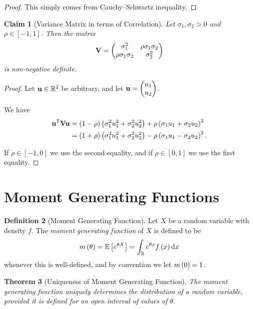 \documentclass{article}
\newtheorem{theorem}{Theorem}[section]
\newtheorem{claim}[theorem]{Claim}
\theoremstyle{definition}
\newtheorem{definition}[theorem]{Definition}
\theoremstyle{remark}
\newcommand{\RR}{\mathbb{R}}
\newcommand{\Expt}{\mathbb{E}}
\newcommand{\transpose}{^{\mathsf{T}}}
\newcommand{\ccintv}[2]{[#1,#2]}
\newcommand{\pmqty}[1]{\begin{pmatrix}#1\end{pmatrix}}
\begin{document}
\begin{proof}
    This simply comes from Cauchy--Schwartz inequality.
\end{proof}

\begin{claim}[Variance Matrix in terms of Correlation]
    \label{claim:var-mat-corr}%
    Let \(\sigma_1, \sigma_2 > 0\) and \(\rho \in \ccintv{-1}{1}\). Then the matrix
    \[
        \vb{V} = \pmqty{
            \sigma_1^2 & \rho \sigma_1 \sigma_2 \\
            \rho \sigma_1 \sigma_2 & \sigma_2^2
        }
    \]
    is non-negative definite.
\end{claim}

\begin{proof}
    Let \(\vb{u} \in \RR^2\) be arbitrary, and let \(\vb{u} = \pmqty{u_1 \\ u_2}\).

    We have
    \begin{align*}
        \vb{u}\transpose \vb{V} \vb{u} &= \pqty{1 - \rho} \pqty{\sigma_1^2 u_1^2 + \sigma_2^2 u_2^2} + \rho \pqty{\sigma_1 u_1 + \sigma_2 u_2}^2 \\
        &= \pqty{1 + \rho} \pqty{\sigma_1^2 u_1^2 + \sigma_2^2 u_2^2} - \rho \pqty{\sigma_1 u_1 - \sigma_2 u_2}^2.
    \end{align*}

    If \(\rho \in \ccintv{-1}{0}\) we use the second equality, and if \(\rho \in \ccintv{0}{1}\) we use the first equality.
\end{proof}

\section{Moment Generating Functions}

\begin{definition}[Moment Generating Function]
    \label{def:moment-generating-fn}%
    Let \(X\) be a random variable with density \(f\). The \emph{moment generating function} of \(X\) is defined to be
    \[
        m\pqty{\theta} = \Expt\bqty{e^{\theta X}} = \int_{\RR} e^{\theta x} f\pqty{x} \dd{x}
    \]
    whenever this is well-defined, and by convention we let \(m\left(0\right) = 1\).
\end{definition}

\begin{theorem}[Uniqueness of Moment Generating Function]
    \label{thm:uniqueness-mgf}%
    The moment generating function uniquely determines the distribution of a random variable, provided it is defined for an open interval of values of \(\theta\).
\end{theorem}
\end{document}
